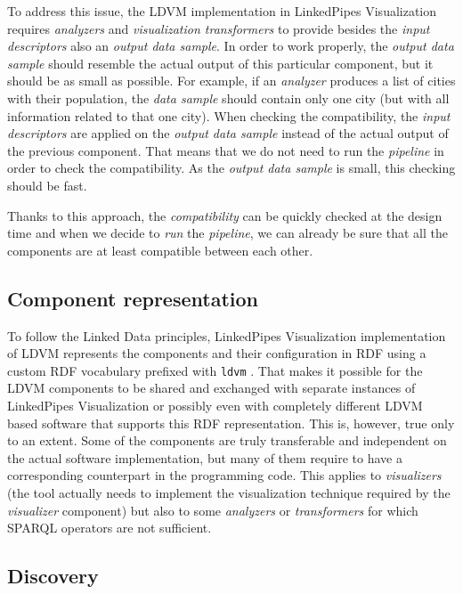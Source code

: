 To address this issue, the LDVM implementation in LinkedPipes Visualization requires \emph{analyzers} and \emph{visualization transformers} to provide besides the \emph{input descriptors} also an \emph{output data sample}. In order to work properly, the \emph{output data sample} should resemble the actual output of this particular component, but it should be as small as possible. For example, if an \emph{analyzer} produces a list of cities with their population, the \emph{data sample} should contain only one city (but with all information related to that one city). When checking the compatibility, the \emph{input descriptors} are applied on the \emph{output data sample} instead of the actual output of the previous component. That means that we do not need to run the \emph{pipeline} in order to check the compatibility. As the \emph{output data sample} is small, this checking should be fast.

Thanks to this approach, the \emph{compatibility} can be quickly checked at the design time and when we decide to \emph{run} the \emph{pipeline}, we can already be sure that all the components are at least compatible between each other.

\subsection{Component representation}

To follow the Linked Data principles, LinkedPipes Visualization implementation of LDVM represents the  components and their configuration in RDF using a custom RDF vocabulary prefixed with \texttt{ldvm} \cite{ldvm_vocabulary}. That makes it possible for the LDVM components to be shared and exchanged with separate instances of LinkedPipes Visualization or possibly even with completely different LDVM based software that supports this RDF representation. This is, however, true only to an extent. Some of the components are truly transferable and independent on the actual software implementation, but many of them require to have a corresponding counterpart in the programming code. This applies to \emph{visualizers} (the tool actually needs to implement the visualization technique required by the \emph{visualizer} component) but also to some \emph{analyzers} or \emph{transformers} for which SPARQL operators are not sufficient.

\subsection{Discovery}

